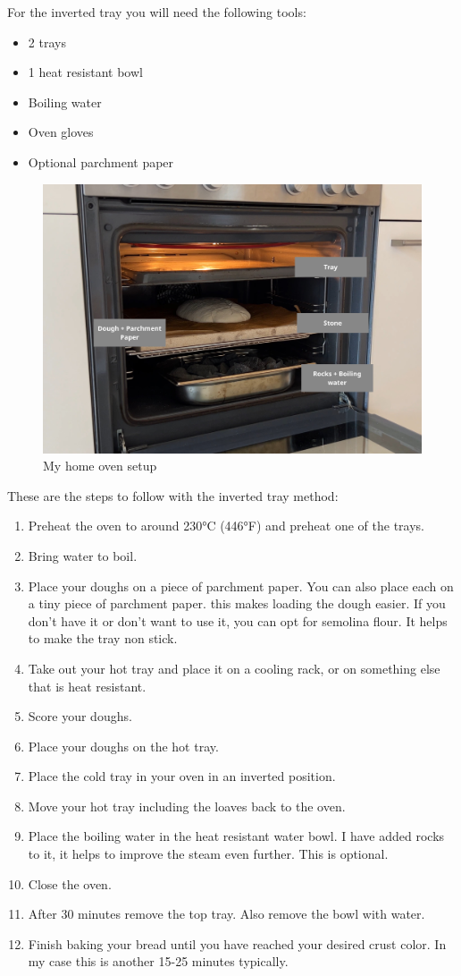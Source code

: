For the inverted tray you will need the following tools:
\begin{itemize}
\item 2 trays
\item 1 heat resistant bowl
\item Boiling water
\item Oven gloves
\item Optional parchment paper
\end{itemize}

\begin{figure}[!htb]
  \includegraphics[width=\textwidth]{baking-example.jpg}
  \caption{My home oven setup}
\end{figure}

These are the steps to follow with the inverted tray method:
\begin{enumerate}
\item Preheat the oven to around 230°C (446°F) and 
preheat one of the trays.
\item Bring water to boil.
\item Place your doughs on a piece of parchment paper. You
can also place each on a tiny piece of parchment paper.
this makes loading the dough easier. If you don't
have it or don't want to use it, you can opt for 
semolina flour. It helps to make the tray non stick.
\item Take out your hot tray and place it
on a cooling rack, or on something else that
is heat resistant.
\item Score your doughs.
\item Place your doughs on the hot tray.
\item Place the cold tray in your oven in an inverted position.
\item Move your hot tray including the loaves back
to the oven.
\item Place the boiling water in the heat resistant
water bowl. I have added rocks to it, it helps
to improve the steam even further. This is optional.
\item Close the oven.
\item After 30 minutes remove the top tray. Also remove the bowl with water.
\item Finish baking your bread until you have reached your desired
crust color. In my case this is another 15-25 minutes typically.
\end{enumerate}

